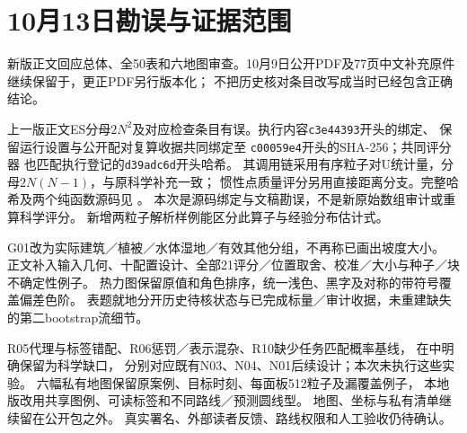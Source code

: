 \section{10月13日勘误与证据范围}\label{sec:reader-v2-errata}
新版正文回应总体、全50表和六地图审查。10月9日公开PDF及77页中文补充原件
继续保留于，更正PDF另行版本化；
不把历史核对条目改写成当时已经包含正确结论。

上一版正文ES分母$2N^2$及对应检查条目有误。执行内容\texttt{c3e44393}开头的绑定、
保留运行设置与公开配对复算收据共同绑定至
\texttt{c00059e4}开头的SHA-256；共同评分器
也匹配执行登记的\texttt{d39adc6d}开头哈希。
其调用链采用有序粒子对U统计量，分母$2N(N-1)$，与原科学补充一致；
惯性点质量评分另用直接距离分支。完整哈希及两个纯函数源码见
。
本次是源码绑定与文稿勘误，不是新原始数组审计或重算科学评分。
新增两粒子解析样例能区分此算子与经验分布估计式。

G01改为实际建筑／植被／水体湿地／有效其他分组，不再称已画出坡度大小。
正文补入输入几何、十配置设计、全部21评分／位置取舍、校准／大小与种子／块不确定性例子。
热力图保留原值和角色排序，统一浅色、黑字及对称的带符号覆盖偏差色阶。
表题就地分开历史待核状态与已完成标量／审计收据，未重建缺失的第二bootstrap流细节。

R05代理与标签错配、R06惩罚／表示混杂、R10缺少任务匹配概率基线，
在中明确保留为科学缺口，
分别对应既有N03、N04、N01后续设计；本次未执行这些实验。
六幅私有地图保留原案例、目标时刻、每面板512粒子及漏覆盖例子，
本地版改用共享图例、可读标签和不同路线／预测圆线型。
地图、坐标与私有清单继续留在公开包之外。
真实署名、外部读者反馈、路线权限和人工验收仍待确认。
